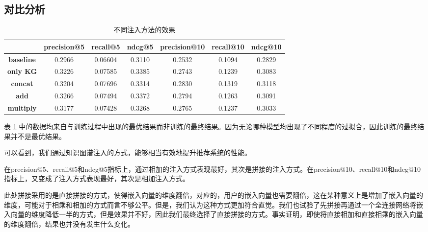 \documentclass{ctexart}
\begin{document}
\begin{sloppypar}
    \subsection{对比分析}
    \begin{table}[h]
        \centering
        \caption{不同注入方法的效果\label{tab:3}}
            \begin{tabular}{ccccccc}
                \toprule
                                  & \textbf{precision@5} & \textbf{recall@5} & \textbf{ndcg@5} & \textbf{precision@10} & \textbf{recall@10} & \textbf{ndcg@10} \\\midrule
                \textbf{baseline} & 0.2966               & 0.06604           & 0.3110          & 0.2532                & 0.1094             & 0.2829           \\
                \textbf{only KG}  & 0.3226               & 0.07585           & 0.3385          & 0.2743                & 0.1239             & 0.3083           \\
                \textbf{concat}   & 0.3204               & 0.07696           & 0.3314          & 0.2830                & 0.1319             & 0.3118           \\
                \textbf{add}      & 0.3266               & 0.07494           & 0.3372          & 0.2794                & 0.1263             & 0.3091           \\
                \textbf{multiply} & 0.3177               & 0.07428           & 0.3268          & 0.2765                & 0.1237             & 0.3033           \\
                \bottomrule
            \end{tabular}
    \end{table}
表 \ref{tab:3} 中的数据均来自与训练过程中出现的最优结果而非训练的最终结果。因为无论哪种模型均出现了不同程度的过拟合，因此训练的最终结果并不是最优结果。

可以看到，我们通过知识图谱注入的方式，能够相当有效地提升推荐系统的性能。

在precision@5、recall@5和ndcg@5指标上，通过相加的注入方式表现最好，其次是拼接的注入方式。在precision@10、recall@10和ndcg@10指标上，又变成了注入方式表现最好，其次是相加注入方式。

此处拼接采用的是直接拼接的方式，使得嵌入向量的维度翻倍，对应的，用户的嵌入向量也需要翻倍，这在某种意义上是增加了嵌入向量的维度，可能对于相乘和相加的方式而言不够公平。但是，我们认为这种方式更加符合直觉。我们也试验了先拼接再通过一个全连接网络将嵌入向量的维度降低一半的方式，但是效果并不好，因此我们最终选择了直接拼接的方式。事实证明，即使将直接相加和直接相乘的嵌入向量的维度翻倍，结果也并没有发生什么变化。


\end{sloppypar}
\end{document}
